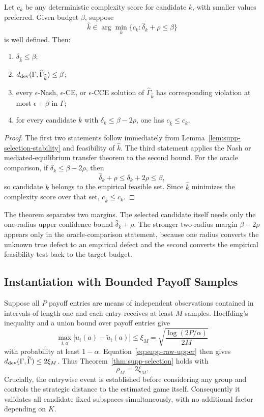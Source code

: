 \begin{theorem}
\label{thm:supp-selection}
Let $c_k$ be any deterministic complexity score for candidate $k$, with smaller values preferred.  Given budget $\beta$, suppose
\[
\widehat k\in\arg\min_k
\{c_k:\widehat\delta_k+\rho\le\beta\}
\]
is well defined.  Then:
\begin{enumerate}
    \item $\delta_{\widehat k}\le\beta$;
    \item $d_{\mathrm{dev}}(\Gamma,\widehat\Gamma_{\widehat k})\le\beta$;
    \item every $\epsilon$-Nash, $\epsilon$-CE, or $\epsilon$-CCE solution of $\widehat\Gamma_{\widehat k}$ has corresponding violation at most $\epsilon+\beta$ in $\Gamma$;
    \item for every candidate $k$ with $\delta_k\le\beta-2\rho$, one has $c_{\widehat k}\le c_k$.
\end{enumerate}
\end{theorem}
\begin{proof}
The first two statements follow immediately from Lemma~\ref{lem:supp-selection-stability} and feasibility of $\widehat k$.  The third statement applies the Nash or mediated-equilibrium transfer theorem to the second bound.  For the oracle comparison, if $\delta_k\le\beta-2\rho$, then
\[
\widehat\delta_k+\rho
\le
\delta_k+2\rho
\le\beta,
\]
so candidate $k$ belongs to the empirical feasible set.  Since $\widehat k$ minimizes the complexity score over that set, $c_{\widehat k}\le c_k$.
\end{proof}

The theorem separates two margins.  The selected candidate itself needs only the one-radius upper confidence bound $\widehat\delta_k+\rho$.  The stronger two-radius margin $\beta-2\rho$ appears only in the oracle-comparison statement, because one radius converts the unknown true defect to an empirical defect and the second converts the empirical feasibility test back to the target budget.

\subsection{Instantiation with Bounded Payoff Samples}

Suppose all $P$ payoff entries are means of independent observations contained in intervals of length one and each entry receives at least $M$ samples.  Hoeffding's inequality and a union bound over payoff entries give
\[
\max_{i,a}|u_i(a)-\widetilde u_i(a)|
\le
\xi_M
=
\sqrt{\frac{\log(2P/\alpha)}{2M}}
\]
with probability at least $1-\alpha$.  Equation~\eqref{eq:supp-raw-upper} then gives
$d_{\mathrm{dev}}(\Gamma,\widetilde\Gamma)\le2\xi_M$.  Thus Theorem~\ref{thm:supp-selection} holds with
\begin{equation}
\rho_M=2\xi_M.
\label{eq:supp-selection-radius}
\end{equation}
Crucially, the entrywise event is established before considering any group and controls the strategic distance to the estimated game itself.  Consequently it validates all candidate fixed subspaces simultaneously, with no additional factor depending on $K$.

